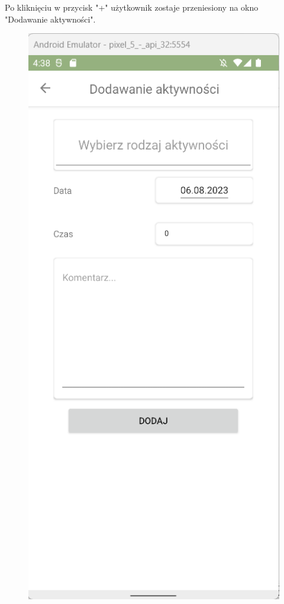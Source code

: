 \documentclass[12pt,oneside]{report}
\begin{document}
Po kliknięciu w przycisk "+" użytkownik zostaje przeniesiony na okno "Dodawanie aktywności".
\begin{figure}[H]
	\begin{center}
	\begin{minipage}{5cm}
	\centering
	\includegraphics[scale=0.6]{AddActivitySimpleView}

\end{minipage}
\end{center}
\end{figure}
\end{document}
